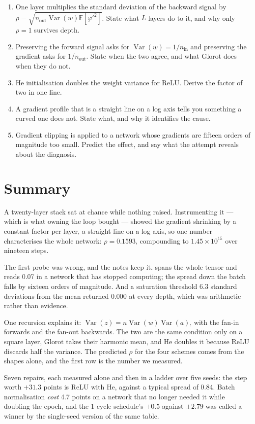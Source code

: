 \documentclass[11pt,a4paper]{article}
\begin{document}
\begin{enumerate}[leftmargin=1.6em,itemsep=4pt]
  \item One layer multiplies the standard deviation of the backward signal by
        $\rho = \sqrt{n_{\text{out}}\operatorname{Var}(w)
        \mathbb{E}[\varphi'^2]}$. State what $L$ layers do to it, and why only
        $\rho = 1$ survives depth. \hfill \scope{[5]}
  \item Preserving the forward signal asks for
        $\operatorname{Var}(w) = 1/n_{\text{in}}$ and preserving the gradient
        asks for $1/n_{\text{out}}$. State when the two agree, and what Glorot
        does when they do not. \hfill \scope{[4]}
  \item He initialisation doubles the weight variance for ReLU. Derive the
        factor of two in one line. \hfill \scope{[4]}
  \item A gradient profile that is a straight line on a log axis tells you
        something a curved one does not. State what, and why it identifies the
        cause. \hfill \scope{[4]}
  \item Gradient clipping is applied to a network whose gradients are fifteen
        orders of magnitude too small. Predict the effect, and say what the
        attempt reveals about the diagnosis. \hfill \scope{[4]}
\end{enumerate}

\section*{Summary}

A twenty-layer stack sat at chance while nothing raised. Instrumenting it ---
which is what owning the loop bought --- showed the gradient shrinking by a
constant factor per layer, a straight line on a log axis, so one number
characterises the whole network: $\rho = 0.1593$, compounding to
$1.45\times10^{15}$ over nineteen steps.

The first probe was wrong, and the notes keep it.  spans the
whole tensor and reads 0.07 in a network that has stopped computing; the spread
down the batch falls by sixteen orders of magnitude. And a saturation threshold
6.3 standard deviations from the mean returned 0.000 at every depth, which was
arithmetic rather than evidence.

One recursion explains it:
$\operatorname{Var}(z) = n\operatorname{Var}(w)\operatorname{Var}(a)$, with the
fan-in forwards and the fan-out backwards. The two are the same condition only
on a square layer, Glorot takes their harmonic mean, and He doubles it because
ReLU discards half the variance. The predicted $\rho$ for the four schemes
comes from the shapes alone, and the first row is the number we measured.

Seven repairs, each measured alone and then in a ladder over five seeds: the
step worth $+31.3$ points is ReLU with He, against a typical spread of 0.84.
Batch normalisation \emph{cost} 4.7 points on a network that no longer needed
it while doubling the epoch, and the 1-cycle schedule's $+0.5$ against
$\pm2.79$ was called a winner by the single-seed version of the same table.
\end{document}
